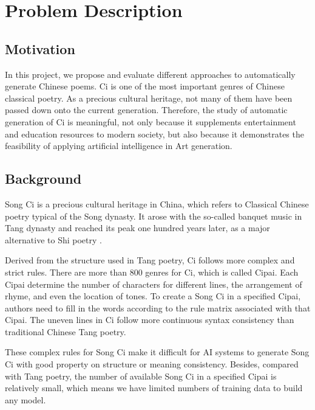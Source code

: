 \section{Problem Description}
\subsection{Motivation}
%
In this project, we propose and evaluate different approaches to automatically generate Chinese poems.
% 
Ci is one of the most important genres of Chinese classical poetry.  
%
As a precious cultural heritage, not many of them have been passed down onto the current generation.
%
Therefore, the study of automatic generation of Ci is meaningful, not only because it supplements entertainment and education resources to modern society, but also because it demonstrates the feasibility of applying artificial intelligence in Art generation.
%

\subsection{Background}
Song Ci is a precious cultural heritage in China, which refers to Classical Chinese poetry typical of the Song dynasty.
%
It arose with the so-called banquet music in Tang dynasty and reached its peak one hundred years later, as a major alternative to Shi poetry\cite{cai2008chinesepoetry} .


Derived from the structure used in Tang poetry, Ci follows more complex and strict rules.
%
There are more than 800 genres for Ci, which is called Cipai\cite{wikici}.
%
Each Cipai determine the number of characters for different lines, the arrangement of rhyme, and even the location of tones.
%
To create a Song Ci in a specified Cipai, authors need to fill in the words according to the rule matrix associated with that Cipai.
 The uneven lines in Ci follow more continuous syntax consistency than traditional Chinese Tang poetry\cite{cai2008chinesepoetry}.

These complex rules for Song Ci make it difficult for AI systems to generate Song Ci with good property on structure or meaning consistency.
%
Besides, compared with Tang poetry, the number of available Song Ci in a specified Cipai is relatively small\cite{}, which means we have limited numbers of training data to build any model.


